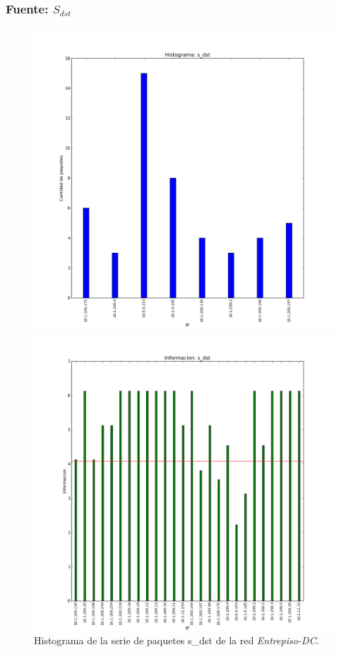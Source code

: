 \documentclass[10pt, a4paper]{article}
\begin{document}
\subsubsection{Fuente: $S_{dst}$}

\begin{figure}[H]
  \begin{minipage}{0.48\linewidth}
    \includegraphics[width=\linewidth]{../imgs/entrepiso-dc-ips_s_dst_hist.png}
    \caption{Histograma de la serie de paquetes s\_dst de la red \emph{Entrepiso-DC}.}
    \label{fig:histograma-entrepiso-dc-s-dst}
  \end{minipage}
\hfill
  \begin{minipage}{0.48\linewidth}
    \includegraphics[width=\linewidth]{../imgs/entrepiso-dc-ips_s_dst_info.png}

\end{minipage}
\end{figure}
\end{document}
